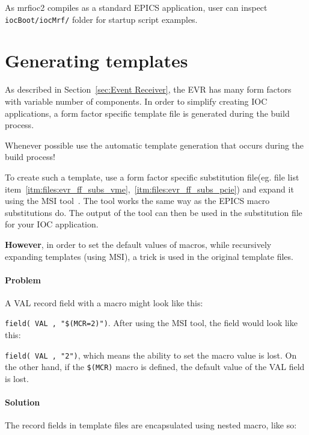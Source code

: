 \documentclass[12pt,a4paper]{article}
\let\stdsection\section
\renewcommand\section{\newpage\stdsection}
\begin{document}
As mrfioc2 compiles as a standard EPICS application, user can inspect \texttt{iocBoot/iocMrf/} folder for startup script examples.

\section{Generating templates}\label{sec:Generating templates}
As described in Section~\ref{sec:Event Receiver}, the EVR has many form factors with variable number of components. In order to simplify creating IOC applications, a form factor specific template file is generated during the build process.

Whenever possible use the automatic template generation that occurs during the build process!

To create such a template, use a form factor specific substitution file(eg. file list item~\ref{itm:files:evr_ff_subs_vme},~\ref{itm:files:evr_ff_subs_pcie}) and expand it using the
MSI tool~\cite{msi}. The tool works the same way as the EPICS macro substitutions do. The output of
the tool can then be used in the substitution file for your IOC application.

\textbf{However}, in order to set the default values of macros, while
recursively expanding templates (using MSI), a trick is used in the original template files.

\paragraph{Problem}\label{problem}
A VAL record field with a macro might look like this:

\texttt{field( VAL , "\$(MCR=2)")}. 
After using the MSI tool, the field would look like this: 

\texttt{field( VAL , "2")}, 
which means the ability to set the macro value is lost. On the other hand, if the \texttt{\$(MCR)} macro is defined, the default value of the VAL field is lost.

\paragraph{Solution}\label{solution}
The record fields in template files are encapsulated using nested macro, like so:
\end{document}
